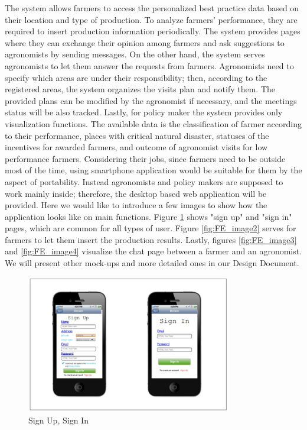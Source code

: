 
The system allows farmers to access the personalized best practice data based on their location and type of production. To analyze farmers' performance, they are required to insert production information periodically. The system provides pages where they can exchange their opinion among farmers and ask suggestions to agronomists by sending messages. 
\newline
\newline
On the other hand, the system serves agronomists to let them answer the requests from farmers. 
Agronomists need to specify which areas are under their responsibility; then, according to the registered areas, the system organizes the visits plan and notify them. The provided plans can be modified by the agronomist if necessary, and the meetings status will be also tracked.
\newline
\newline
Lastly, for policy maker the system provides only visualization functions. The available data is the classification of farmer according to their performance, places with critical natural disaster, statuses of the incentives for awarded farmers, and outcome of agronomist visits for low performance farmers. 
\newline
\newline
Considering their jobs, since farmers need to be outside most of the time, using smartphone application would be suitable for them by the aspect of portability. Instead agronomists and policy makers are supposed to work mainly inside; therefore, the desktop based web application will be provided. 
\newline
\newline
Here we would like to introduce a few images to show how the application looks like on main functions. Figure \ref{fig:FE_image1} shows "sign up" and "sign in" pages, which are common for all types of user. Figure \ref{fig:FE_image2} serves for farmers to let them insert the production results. Lastly, figures \ref{fig:FE_image3} and \ref{fig:FE_image4} visualize the chat page between a farmer and an agronomist. We will present other mock-ups and more detailed ones in our Design Document. 

\begin{figure}[H]
	\centering
    \includegraphics[page=1, width=0.8\textwidth]{Images/sign_up_in.JPG}

	\caption{\label{fig:FE_image1}Sign Up, Sign In}

\end{figure}

